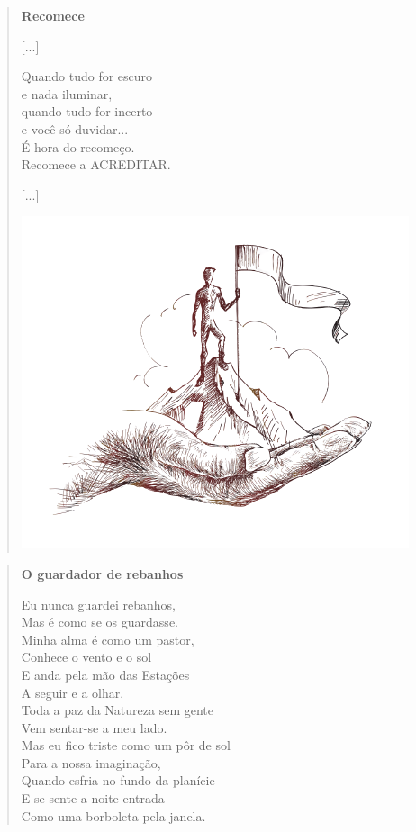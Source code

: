 \begin{myquote}
\begin{verse}
\textbf{Recomece}

{[}...{]}

Quando tudo for escuro\\
e nada iluminar,\\
quando tudo for incerto\\
e você só duvidar...\\
É hora do recomeço.\\
Recomece a ACREDITAR.

{[}...{]}

\begin{center}
\includegraphics[width=.7\textwidth]{./media/image24b.png}
\end{center}

\end{verse}

\begin{verse}
\textbf{O guardador de rebanhos}

Eu nunca guardei rebanhos,\\
Mas é como se os guardasse.\\
Minha alma é como um pastor,\\
Conhece o vento e o sol\\
E anda pela mão das Estações\\
A seguir e a olhar.\\
Toda a paz da Natureza sem gente\\
Vem sentar-se a meu lado.\\
Mas eu fico triste como um pôr de sol\\
Para a nossa imaginação,\\
Quando esfria no fundo da planície\\
E se sente a noite entrada\\
Como uma borboleta pela janela.


\end{verse}
\end{myquote}

